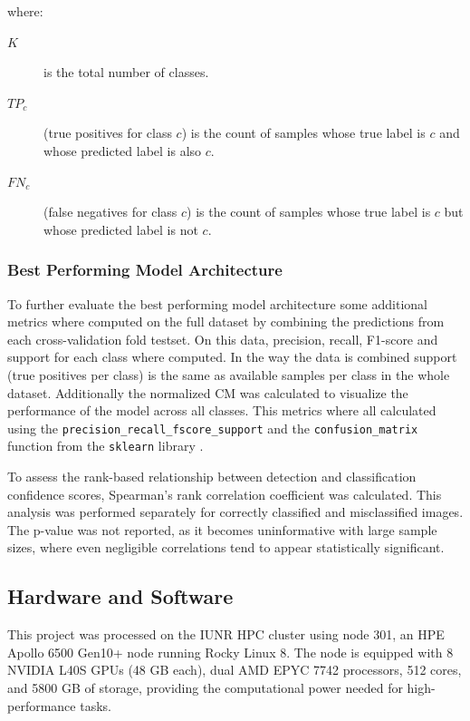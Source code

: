     \noindent where:
    \begin{description}
        \item[\(K\)] is the total number of classes.
        \item[\(TP_{c}\)] (true positives for class \(c\)) is the count of samples whose true label is \(c\) and whose predicted label is also \(c\).
        \item[\(FN_{c}\)] (false negatives for class \(c\)) is the count of samples whose true label is \(c\) but whose predicted label is not \(c\).
    \end{description}

    \subsubsection{Best Performing Model Architecture}
    To further evaluate the best performing model architecture some additional metrics where computed on the full dataset by combining the predictions from each cross-validation fold testset.
    On this data, precision, recall, F1-score and support for each class where computed.
    In the way the data is combined support (true positives per class) is the same as available samples per class in the whole dataset.
    Additionally the normalized \ac{CM} was calculated to visualize the performance of the model across all classes.
    This metrics where all calculated using the \texttt{precision\_recall\_fscore\_support} and the \texttt{confusion\_matrix} function from the \texttt{sklearn} library \autocite{pedregosaScikitlearnMachineLearning2011}.

    To assess the rank-based relationship between detection and classification confidence scores, Spearman's rank correlation coefficient was calculated. 
    This analysis was performed separately for correctly classified and misclassified images. 
    The p-value was not reported, as it becomes uninformative with large sample sizes, where even negligible correlations tend to appear statistically significant.

    \subsection{Hardware and Software}
    This project was processed on the \ac{IUNR} \ac{HPC} cluster using node 301, an HPE Apollo 6500 Gen10+ node running Rocky Linux 8. 
    The node is equipped with 8 NVIDIA L40S \acp{GPU} (48 \ac{GB} each), dual AMD EPYC 7742 processors, 512 cores, and 5800 \ac{GB} of storage, providing the computational power needed for high-performance tasks.


